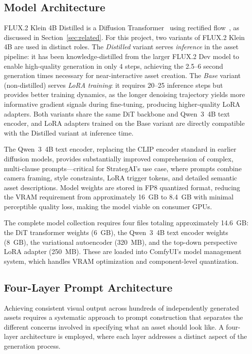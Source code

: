 \documentclass[conference]{IEEEtran}
\begin{document}
\subsection{Model Architecture}

FLUX.2 Klein 4B Distilled is a Diffusion Transformer~\cite{peebles2023scalable} using rectified flow~\cite{liu2023rectified}, as discussed in Section~\ref{sec:related}. For this project, two variants of FLUX.2 Klein 4B are used in distinct roles. The \emph{Distilled} variant serves \emph{inference} in the asset pipeline: it has been knowledge-distilled from the larger FLUX.2 Dev model to enable high-quality generation in only 4 steps, achieving the 2.5--6 second generation times necessary for near-interactive asset creation. The \emph{Base} variant (non-distilled) serves \emph{LoRA training}: it requires 20--25 inference steps but provides better training dynamics, as the longer denoising trajectory yields more informative gradient signals during fine-tuning, producing higher-quality LoRA adapters. Both variants share the same DiT backbone and Qwen~3~4B text encoder, and LoRA adapters trained on the Base variant are directly compatible with the Distilled variant at inference time.

The Qwen~3~4B text encoder, replacing the CLIP encoder standard in earlier diffusion models, provides substantially improved comprehension of complex, multi-clause prompts---critical for StrategAI's use case, where prompts combine camera framing, style constraints, LoRA trigger tokens, and detailed semantic asset descriptions. Model weights are stored in FP8 quantized format, reducing the VRAM requirement from approximately 16~GB to 8.4~GB with minimal perceptible quality loss, making the model viable on consumer GPUs.

The complete model collection requires four files totaling approximately 14.6~GB: the DiT transformer weights (6~GB), the Qwen~3~4B text encoder weights (8~GB), the variational autoencoder (320~MB), and the top-down perspective LoRA adapter (250~MB). These are loaded into ComfyUI's model management system, which handles VRAM optimization and component-level quantization.

\subsection{Four-Layer Prompt Architecture}

Achieving consistent visual output across hundreds of independently generated assets requires a systematic approach to prompt construction that separates the different concerns involved in specifying what an asset should look like. A four-layer architecture is employed, where each layer addresses a distinct aspect of the generation process.
\end{document}

